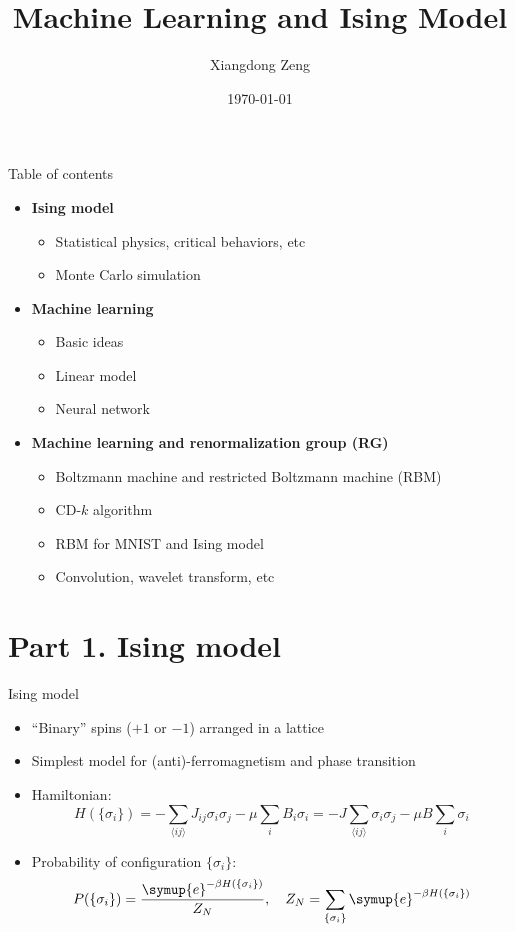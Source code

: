 \documentclass[aspectratio=169]{beamer}
\title{Machine Learning and Ising Model}
\date{\today}
\author{Xiangdong Zeng}
\institute{Department of Physics, Fudan University}
\def\ee{{\symup{e}}}
\def\nearest#1{\langle#1\rangle}
\def\q#1{{\{#1\}}}
\def\CDk{CD-$k$}
\begin{document}
\maketitle

\begin{frame}{Table of contents}
\begin{itemize}
  \item \textbf{Ising model}
    \begin{itemize}
      \item Statistical physics, critical behaviors, etc
      \item Monte Carlo simulation
    \end{itemize}
  \item \textbf{Machine learning}
    \begin{itemize}
      \item Basic ideas
      \item Linear model
      \item Neural network
    \end{itemize}
  \item \textbf{Machine learning and renormalization group (RG)}
    \begin{itemize}
      \item Boltzmann machine and restricted Boltzmann machine (RBM)
      \item \CDk{} algorithm
      \item RBM for MNIST and Ising model
      \item Convolution, wavelet transform, etc
    \end{itemize}
\end{itemize}
\end{frame}

\section{Part 1. Ising model}

\begin{frame}{Ising model}
\begin{itemize}
  \item ``Binary'' spins ($+1$ or $-1$) arranged in a lattice
  \item Simplest model for (anti)-ferromagnetism and phase transition
  \item Hamiltonian:
    \[
      H(\q{\sigma_i}) = -\sum_{\nearest{ij}} J_{ij}\sigma_i\sigma_j - \mu \sum_{i} B_i\sigma_i
                      = -J \sum_{\nearest{ij}} \sigma_i\sigma_j - \mu B \sum_{i} \sigma_i
    \]
  \item Probability of configuration $\q{\sigma_i}$:
    \[
      P(\q{\sigma_i}) = \frac{\ee^{-\beta H(\q{\sigma_i})}}{Z_N} \qc
      Z_N = \sum_\q{\sigma_i} \ee^{-\beta H(\q{\sigma_i})}
    \]
\end{itemize}
\end{frame}
\end{document}
